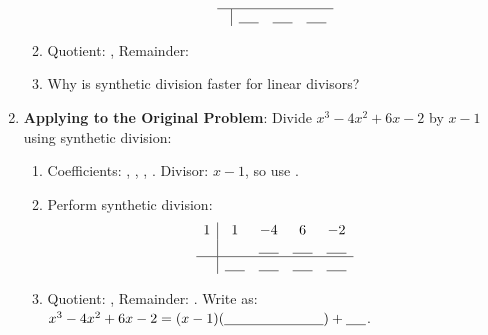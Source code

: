 \documentclass[12pt]{article}
\begin{document}
\begin{enumerate}[label=9.\arabic*]
\begin{enumerate}[label=\alph*)]
\[\begin{array}{c|ccc}
        \hline
          & \underline{\hspace{0.5cm}} & \underline{\hspace{0.5cm}} & \underline{\hspace{0.5cm}} \\
        \end{array}
        \]
        \item Quotient: \underline{\hspace{1.5cm}}, Remainder: \underline{\hspace{0.5cm}}
        \item Why is synthetic division faster for linear divisors? \underline{\hspace{4cm}}
    \end{enumerate}
    \item \textbf{Applying to the Original Problem}: Divide \( x^3 - 4x^2 + 6x - 2 \) by \( x - 1 \) using synthetic division:
    \begin{enumerate}[label=\alph*)]
        \item Coefficients: \underline{\hspace{0.5cm}}, \underline{\hspace{0.5cm}}, \underline{\hspace{0.5cm}}, \underline{\hspace{0.5cm}}. Divisor: \( x - 1 \), so use \underline{\hspace{0.5cm}}.
        \item Perform synthetic division: \\
        \[
        \begin{array}{c|cccc}
        1 & 1 & -4 & 6 & -2 \\
          &   & \underline{\hspace{0.5cm}} & \underline{\hspace{0.5cm}} & \underline{\hspace{0.5cm}} \\
        \hline
          & \underline{\hspace{0.5cm}} & \underline{\hspace{0.5cm}} & \underline{\hspace{0.5cm}} & \underline{\hspace{0.5cm}} \\
        \end{array}
        \]
        \item Quotient: \underline{\hspace{2.5cm}}, Remainder: \underline{\hspace{0.5cm}}. Write as: \( x^3 - 4x^2 + 6x - 2 = (x - 1)(\underline{\hspace{2.5cm}}) + \underline{\hspace{0.5cm}} \).
    \end{enumerate}
\end{enumerate}
\end{document}
